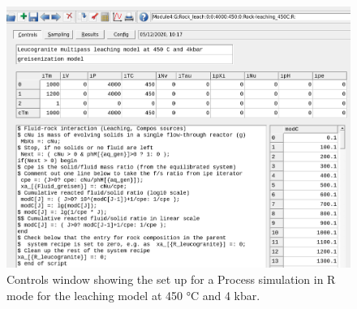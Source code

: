 \documentclass[
]{book}
\begin{document}
\begin{figure}
\includegraphics[width=1\linewidth]{figures/module4/fig-7} \caption{Controls window showing the set up for a Process simulation in R mode for the leaching model at 450 °C and 4 kbar.}\label{fig:fig-7d}
\end{figure}
\end{document}
